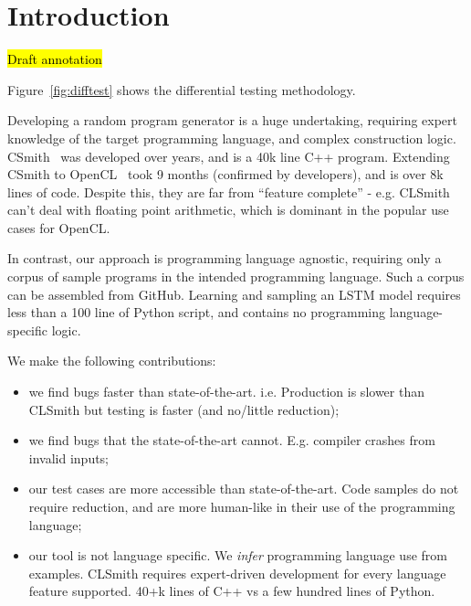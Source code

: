 \section{Introduction}\label{sec:intro}

\hl{Draft annotation}

\noindent
Figure~\ref{fig:difftest} shows the differential testing methodology.

Developing a random program generator is a huge undertaking, requiring expert knowledge of the target programming language, and complex construction logic. CSmith~\cite{Yang2011} was developed over years, and is a 40k line C++ program. Extending CSmith to OpenCL~\cite{Lidbury2015a} took 9 months (confirmed by developers), and is over 8k lines of code. Despite this, they are far from ``feature complete'' - e.g. CLSmith can't deal with floating point arithmetic, which is dominant in the popular use cases for OpenCL.

In contrast, our approach is programming language agnostic, requiring only a corpus of sample programs in the intended programming language. Such a corpus can be assembled from GitHub. Learning and sampling an LSTM model requires less than a 100 line of Python script, and contains no programming language-specific logic.


We make the following contributions:
%
\begin{itemize}
\item we find bugs faster than state-of-the-art. i.e. Production is slower than CLSmith but testing is faster (and no/little reduction);
\item we find bugs that the state-of-the-art cannot. E.g. compiler crashes from invalid inputs;
\item our test cases are more accessible than state-of-the-art. Code samples do not require reduction, and are more human-like in their use of the programming language;
\item our tool is not language specific. We \emph{infer} programming language use from examples. CLSmith requires expert-driven development for every language feature supported. 40+k lines of C++ vs a few hundred lines of Python.
\end{itemize}

